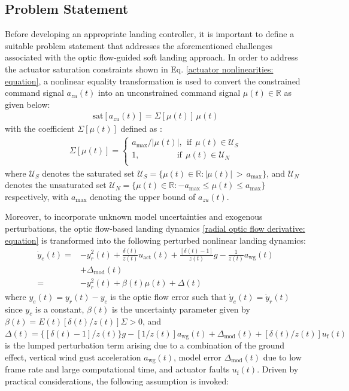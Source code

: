 \documentclass{IEEEtaes}
\begin{document}
\subsection{Problem Statement} \label{problem statement: section}
Before developing an appropriate landing controller, it is important to define a suitable problem statement that addresses the aforementioned challenges associated with the optic flow-guided soft landing approach.
In order to address the actuator saturation constraints shown in Eq. \eqref{actuator nonlinearities: equation}, a nonlinear equality transformation is used to convert the constrained command signal $a_{zu}(t)$ into an unconstrained command signal ${\mu}(t)\in\mathbb{R}$ as given below:
\begin{eqnarray}
 \label{saturated input: equation}
 \text{sat}[a_{zu}(t)]={\Sigma}[\mu(t)]\,\mu(t)
\end{eqnarray}
with the coefficient ${\Sigma}[\mu(t)]$ defined as \cite{Shao:2022}:
\begin{align}
    \label{sat_fun}
    {\Sigma}[\mu(t)]=\begin{cases}
    a_{\text{max}}/\lvert \mu(t) \rvert,~~\text{if}~~\mu(t)\in\mathcal{U}_{S}\\
    1,~~\qquad\qquad\text{if}~~\mu(t)\in\mathcal{U}_{N}\\
    \end{cases}
\end{align}
where $\mathcal{U}_S$ denotes the saturated set $\mathcal{U}_{S}=\{\mu(t)\in\mathbb{R}:{\lvert \mu(t) \rvert}\,>\,a_{\text{max}}\}$, and $\mathcal{U}_{N}$ denotes the unsaturated set $\mathcal{U}_{N}=\{\mu(t)\in\mathbb{R}:-a_{\text{max}}\leq \mu(t) \leq a_{\text{max}}\}$ respectively, with $a_{\text{max}}$ denoting the upper bound of $a_{zu}(t)$.

Moreover, to incorporate unknown model uncertainties and exogenous perturbations, the optic flow-based landing dynamics \eqref{radial optic flow derivative: equation} is transformed into the following perturbed nonlinear landing dynamics:
\begin{align} 
\label{perturbed system dynamics: equation}
    \dot{y}_e(t) =& - y_r^2(t)+\frac{\delta(t)}{z(t)} u_{\text{act}}(t) + \frac{[\delta(t){-}1]}{z(t)}g - \frac{1}{z(t)}a_{\text{wg}}(t)
    \nonumber\\ & + \Delta_{\text{mod}}(t)
    \nonumber\\=& -y_r^2(t) + \beta(t) \mu(t) + \Delta(t)
\end{align}
where $y_e(t) = y_r(t) - y_c$ is the optic flow error such that $\dot{y}_e(t) = \dot{y}_r(t)$ since $y_c$ is a constant, $\beta(t)$ is the uncertainty parameter given by $\beta(t) = E(t)[\delta(t)/z(t)]\Sigma>0$, and $\Delta(t)=\{[\delta(t){-}1]/z(t)\}g-[1/z(t)]a_{\text{wg}}(t)+\Delta_{\text{mod}}(t)+[\delta(t)/z(t)]u_{\text{f}}(t)$ is the lumped perturbation term arising due to a combination of the ground effect, vertical wind gust acceleration $a_{\text{wg}}(t)$, model error $\Delta_{\text{mod}}(t)$ due to low frame rate and large computational time, and actuator faults $u_{\text{f}}(t)$. 
Driven by practical considerations, the following assumption is invoked:
\end{document}
